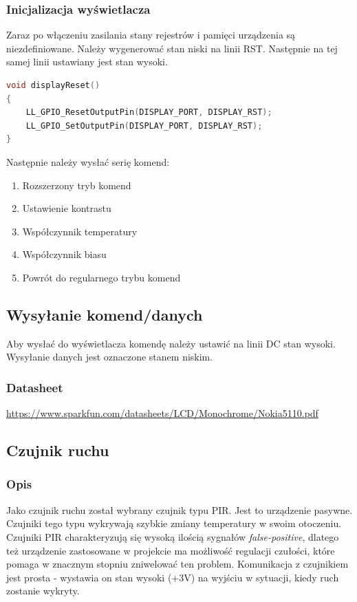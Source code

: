 \documentclass{article}
\begin{document}
\subsubsection{Inicjalizacja wyświetlacza}
Zaraz po włączeniu zasilania stany rejestrów i pamięci urządzenia są niezdefiniowane.
Należy wygenerować stan niski na linii RST. Następnie na tej samej linii ustawiany
jest stan wysoki.

\begin{center}
\begin{lstlisting}[language=C, basicstyle=\footnotesize]
void displayReset()
{
    LL_GPIO_ResetOutputPin(DISPLAY_PORT, DISPLAY_RST);
    LL_GPIO_SetOutputPin(DISPLAY_PORT, DISPLAY_RST);
} 
\end{lstlisting}
\end{center}

Następnie należy wysłać serię komend:

\begin{enumerate}
    \item Rozszerzony tryb komend
    \item Ustawienie kontrastu
    \item Współczynnik temperatury
    \item Współczynnik biasu
    \item Powrót do regularnego trybu komend
\end{enumerate}


\subsection{Wysyłanie komend/danych}
Aby wysłać do wyświetlacza komendę należy ustawić na linii DC stan wysoki. Wysyłanie danych
jest oznaczone stanem niskim.
\subsubsection{Datasheet}

\url{https://www.sparkfun.com/datasheets/LCD/Monochrome/Nokia5110.pdf}
\subsection{Czujnik ruchu}

\subsubsection{Opis}
Jako czujnik ruchu został wybrany czujnik typu PIR. Jest to urządzenie pasywne.
Czujniki tego typu wykrywają szybkie zmiany temperatury w swoim otoczeniu. Czujniki
PIR charakteryzują się wysoką ilością sygnałów \emph{false-positive}, dlatego też
urządzenie zastosowane w projekcie ma możliwość regulacji czułości, które pomaga
w znacznym stopniu zniwelować ten problem. Komunikacja z czujnikiem jest prosta - wystawia
on stan wysoki (+3V) na wyjściu w sytuacji, kiedy ruch zostanie wykryty.
\end{document}
